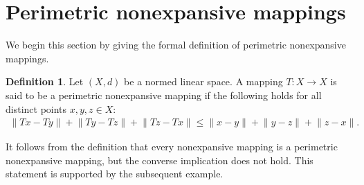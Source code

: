 \documentclass[11pt,reqno]{amsart}
\theoremstyle{definition}
\newtheorem{definition}[theorem]{Definition}
\newtheorem{Open Prob}[theorem]{Open Problem}
\theoremstyle{remark}
\numberwithin{equation}{section}
\begin{document}
   
\section{Perimetric nonexpansive mappings}
We begin this section by giving the formal definition of perimetric nonexpansive mappings.
\begin{definition}\label{D21}
Let $(X,d)$ be a normed linear space. A mapping $T: X \to X$ is said to be a perimetric nonexpansive mapping if  the following holds for all distinct points $x,y,z \in X$:
\begin{align}
\lVert Tx-Ty \rVert+ \lVert Ty-Tz \rVert+ \lVert Tz-Tx \rVert
\le \lVert x-y \rVert+ \lVert y-z \rVert+ \lVert z-x \rVert. \label{pnm}
\end{align}
\end{definition}
It follows from the definition that every nonexpansive mapping is a perimetric nonexpansive mapping, but the converse implication does not hold. This statement is supported by the subsequent example.
\end{document}
